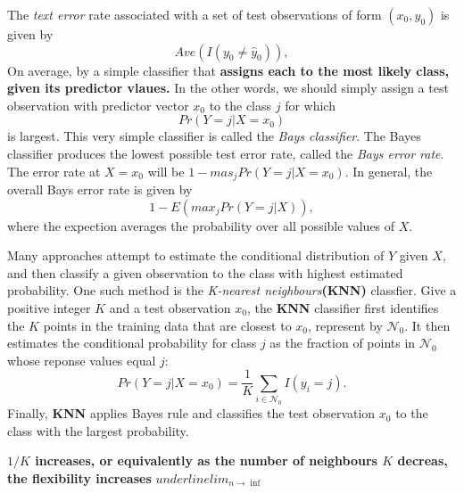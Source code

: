 \documentclass{article}
\begin{document}
The \textit{text error} rate associated with a set of test observations of form $(x_0,y_0)$ is given by
\begin{equation}
Ave(I(y_0\neq \hat{y}_0)),
\end{equation}
On average, by a simple classifier that \textbf{assigns each to the most likely class, given its predictor vlaues.} In the other words, we should simply assign a test observation with predictor vector $x_0$ to the class $j$ for which 
\begin{equation}
Pr(Y = j|X = x_0) 
\end{equation}
is largest. This very simple classifier is called the \textit{Bays classifier}. The Bayes classifier produces the lowest possible test error rate, called the \textit{Bays error rate}. The error rate at $X = x_0$ will be $1-{mas}_jPr(Y = j|X = x_0)$. In general, the overall Bays error rate is given by 
\begin{equation}
1 - E({max}_jPr(Y = j|X)),
\end{equation}
where the expection averages the probability over all possible values of $X$.

Many approaches attempt to estimate the conditional distribution of $Y$ given $X$, and then	classify a given observation to the class with highest estimated probability. One such method is the \textit{K-nearest neighbours}\textbf{(KNN)} classfier. Give a positive integer $K$ and a test observation $x_0$, the \textbf{KNN} classifier first identifies the $K$ points in the training data that are closest to $x_0$, represent by $\mathcal{N}_0$. It then estimates the conditional probability for class $j$ as the fraction of points in $\mathcal{N}_0$ whose reponse values equal $j$:
\begin{equation}
Pr(Y = j|X = x_0) = \frac{1}{K}\sum_{i\in\mathcal{N}_0}I(y_i = j).
\end{equation}
Finally, \textbf{KNN} applies Bayes rule and classifies the test observation
$x_0$ to the class with the largest probability.

\textbf{$1/K$ increases, or equivalently as the number of neighbours $K$ decreas, the flexibility increases}
$underline{lim}_{n \rightarrow \inf}$
\end{document}
